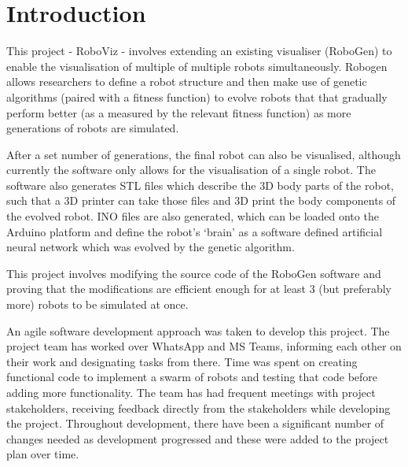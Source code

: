 \documentclass[11pt,a4paper]{article}
\begin{document}
\tableofcontents
\section{Introduction}
\label{s:introduction}
%
%

This project - RoboViz - involves extending an existing visualiser (RoboGen) to
enable the visualisation of multiple of multiple robots simultaneously.
Robogen allows researchers to define a robot structure and then make use of
genetic algorithms (paired with a fitness function) to evolve robots that that
gradually perform better (as a measured by the relevant fitness function) as
more generations of robots are simulated.

After a set number of generations, the final robot can also be visualised,
although currently the software only allows for the visualisation of a single
robot. The software also generates STL files which describe the 3D body parts
of the robot, such that a 3D printer can take those files and 3D print the body
components of the evolved robot. INO files are also generated, which can be
loaded onto the Arduino platform and define the robot’s ‘brain’ as a software
defined artificial neural network which was evolved by the genetic algorithm.

This project involves modifying the source code of the RoboGen software and
proving that the modifications are efficient enough for at least 3 (but
preferably more) robots to be simulated at once.

An agile software development approach was taken to develop this project. The
project team has worked over WhatsApp and MS Teams, informing each other on
their work and designating tasks from there. Time was spent on creating
functional code to implement a swarm of robots and testing that code before
adding more functionality. The team has had frequent meetings with project
stakeholders, receiving feedback directly from the stakeholders while
developing the project. Throughout development, there have been a significant
number of changes needed as development progressed and these were added to the
project plan over time.
\end{document}
